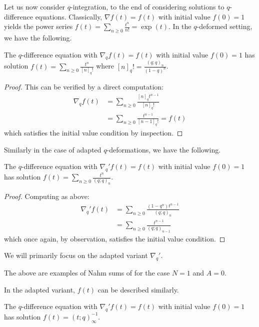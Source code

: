 Let us now consider $q$-integration, to the end of considering solutions to $q$-difference equations. Classically, $\nabla f(t)=f(t)$ with initial value $f(0)=1$ yields the power series $f(t)=\sum_{n\geq0}\frac{t^{n}}{n!}=\exp(t)$. In the $q$-deformed setting, we have the following. 
\begin{proposition}\label{prop: q-deformed exponential}
    The $q$-difference equation with $\nabla_{q}f(t)=f(t)$ with initial value $f(0)=1$ has solution $f(t)=\sum_{n\geq0}\frac{t^{n}}{[n]_{q}!}$ where $[n]_{q}!=\frac{(q;q)_{n}}{(1-q)^{n}}$.
\end{proposition}
\begin{proof}
    This can be verified by a direct computation:
    \begin{align*}
        \nabla_{q}f(t) &= \sum_{n\geq0}\frac{[n]_{q}t^{n-1}}{[n]_{q}!} \\
        &=\sum_{n\geq0}\frac{t^{n-1}}{[n-1]_{q}!} = f(t)
    \end{align*}
    which satisfies the initial value condition by inspection. 
\end{proof}
Similarly in the case of adapted $q$-deformations, we have the following. 
\begin{proposition}\label{prop: adapted q-deformed exponential}
    The $q$-difference equation with $\nabla_{q}'f(t)=f(t)$ with initial value $f(0)=1$ has solution $f(t)=\sum_{n\geq0}\frac{t^{n}}{(q;q)_{n}}$. 
\end{proposition}
\begin{proof}
    Computing as above:
    \begin{align*}
        \nabla_{q}'f(t) &= \sum_{n\geq0}\frac{(1-q^{n})t^{n-1}}{(q;q)_{n}} \\
        &=\sum_{n\geq0}\frac{t^{n-1}}{(q;q)_{n-1}}
    \end{align*}
    which once again, by observation, satisfies the initial value condition. 
\end{proof}
\begin{remark}
    We will primarily focus on the adapted variant $\nabla_{q}'$. 
\end{remark}
\begin{remark}
    The above are examples of Nahm sums of  for the case $N=1$ and $A=0$. 
\end{remark}
In the adapted variant, $f(t)$ can be described similarly.  
\begin{proposition}\label{prop: Pochhammer as exponential}
    The $q$-difference equation with $\nabla_{q}'f(t)=f(t)$ with initial value $f(0)=1$ has solution $f(t)=(t;q)_{\infty}^{-1}$.
\end{proposition}
